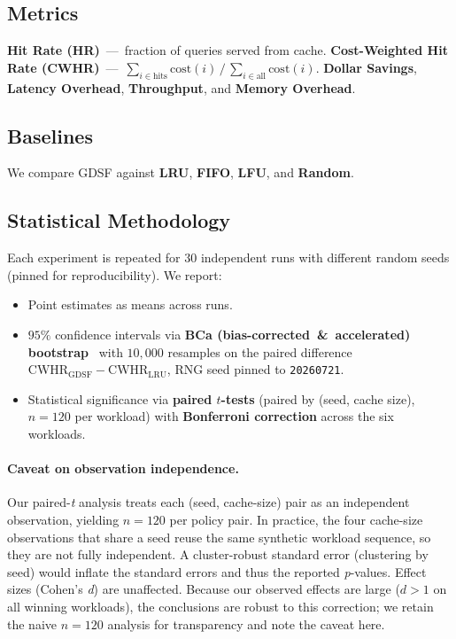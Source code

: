 \documentclass[sigconf, nonacm, review=false, screen=true]{acmart}
\begin{document}
\subsection{Metrics}
\textbf{Hit Rate (HR)}~---~fraction of queries served from cache.
\textbf{Cost-Weighted Hit Rate (CWHR)}~---~$\sum_{i \in \text{hits}}
\text{cost}(i) \,/\, \sum_{i \in \text{all}} \text{cost}(i)$.
\textbf{Dollar Savings}, \textbf{Latency Overhead}, \textbf{Throughput},
and \textbf{Memory Overhead}.

\subsection{Baselines}
We compare GDSF against \textbf{LRU}, \textbf{FIFO}, \textbf{LFU}, and
\textbf{Random}.

\subsection{Statistical Methodology}
\label{sec:stats-method}
Each experiment is repeated for $30$ independent runs with different
random seeds (pinned for reproducibility). We report:
\begin{itemize}[leftmargin=1.4em]
  \item Point estimates as means across runs.
  \item $95\%$ confidence intervals via \textbf{BCa
        (bias-corrected~\&~accelerated) bootstrap}~\cite{efron1987bca}
        with $10{,}000$ resamples on the paired difference
        $\text{CWHR}_{\text{GDSF}} - \text{CWHR}_{\text{LRU}}$,
        RNG seed pinned to \texttt{20260721}.
  \item Statistical significance via \textbf{paired $t$-tests}
        (paired by (seed, cache size), $n=120$ per workload) with
        \textbf{Bonferroni correction} across the six workloads.
\end{itemize}

\paragraph{Caveat on observation independence.} Our paired-\emph{t}
analysis treats each (seed, cache-size) pair as an independent
observation, yielding $n=120$ per policy pair. In practice, the four
cache-size observations that share a seed reuse the same synthetic
workload sequence, so they are not fully independent. A cluster-robust
standard error (clustering by seed) would inflate the standard errors
and thus the reported \emph{p}-values. Effect sizes (Cohen's \emph{d})
are unaffected. Because our observed effects are large ($d > 1$ on all
winning workloads), the conclusions are robust to this correction; we
retain the naive $n=120$ analysis for transparency and note the caveat
here.
\end{document}
